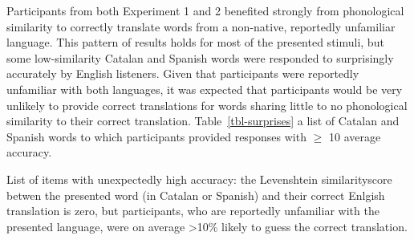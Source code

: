 \documentclass[
]{article}
\begin{document}
Participants from both Experiment 1 and 2 benefited strongly from
phonological similarity to correctly translate words from a non-native,
reportedly unfamiliar language. This pattern of results holds for most
of the presented stimuli, but some low-similarity Catalan and Spanish
words were responded to surprisingly accurately by English listeners.
Given that participants were reportedly unfamiliar with both languages,
it was expected that participants would be very unlikely to provide
correct translations for words sharing little to no phonological
similarity to their correct translation. Table~\ref{tbl-surprises} a
list of Catalan and Spanish words to which participants provided
responses with \(\geq\) 10 average accuracy.

\begin{table}

\caption{\label{tbl-surprises}List of items with unexpectedly high
accuracy: the Levenshtein similarityscore betwen the presented word (in
Catalan or Spanish) and their correct Enlgish translation is zero, but
participants, who are reportedly unfamiliar with the presented language,
were on average \textgreater10\% likely to guess the correct
translation.}

\centering{

}
\end{table}
\end{document}
